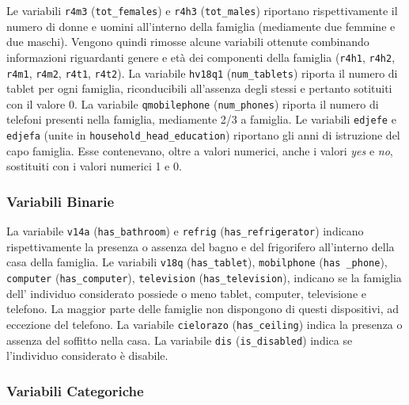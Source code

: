 Le variabili \texttt{r4m3} (\texttt{tot\_females}) e \texttt{r4h3} (\texttt{tot\_males}) riportano rispettivamente il numero di donne e uomini all'interno della famiglia (mediamente due femmine e due maschi).
Vengono quindi rimosse alcune variabili ottenute combinando informazioni riguardanti genere e età dei componenti della famiglia (\texttt{r4h1}, \texttt{r4h2}, \texttt{r4m1}, \texttt{r4m2}, \texttt{r4t1}, \texttt{r4t2}).
La variabile \texttt{hv18q1} (\texttt{num\_tablets}) riporta il numero di tablet per ogni famiglia, riconducibili all'assenza degli stessi e pertanto sotituiti con il valore 0.
La variabile \texttt{qmobilephone} (\texttt{num\_phones}) riporta il numero di telefoni presenti nella famiglia, mediamente 2/3 a famiglia.
Le variabili \texttt{edjefe} e \texttt{edjefa} (unite in \texttt{household\_head\_education}) riportano gli anni di istruzione del capo famiglia. Esse contenevano, oltre a valori numerici, anche i valori \textit{yes} e \textit{no}, sostituiti con i valori numerici 1 e 0.

\subsubsection{Variabili Binarie}

La variabile \texttt{v14a} (\texttt{has\_bathroom}) e  \texttt{refrig} (\texttt{has\_refrigerator}) indicano rispettivamente la presenza o assenza del bagno e del frigorifero all'interno della casa della famiglia.
Le variabili \texttt{v18q} (\texttt{has\_tablet}), \texttt{mobilphone} (\texttt{has \_phone}), \texttt{computer} (\texttt{has\_computer}),  \texttt{television} (\texttt{has\_television}), indicano se la famiglia dell' individuo considerato possiede o meno tablet, computer, televisione e telefono.
La maggior parte delle famiglie non dispongono di questi dispositivi, ad eccezione del telefono.
La variabile \texttt{cielorazo} (\texttt{has\_ceiling}) indica la presenza o assenza del soffitto nella casa.
La variabile \texttt{dis} (\texttt{is\_disabled}) indica se l'individuo considerato è disabile.

\subsubsection{Variabili Categoriche}

